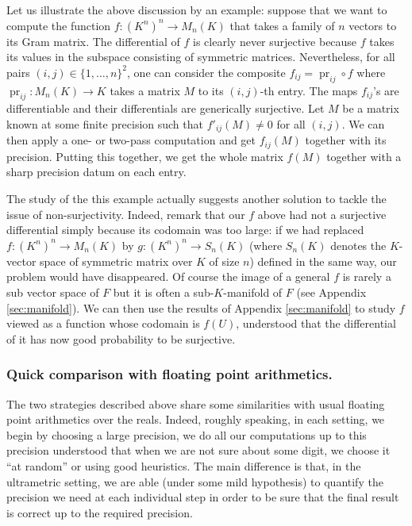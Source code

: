 \documentclass{lms}
\DeclareMathOperator{\pr}{pr}
\begin{document}
Let us illustrate the above discussion by an example: suppose that we 
want to compute the function $f : (K^n)^n \to M_n(K)$ that takes a 
family of $n$ vectors to its Gram matrix. The differential of $f$ is
clearly never surjective because $f$ takes its values in the subspace
consisting of symmetric matrices. Nevertheless, for all pairs $(i,j)
\in \{1, \ldots, n\}^2$, one can consider the composite $f_{ij} = 
\pr_{ij} \circ f$ where $\pr_{ij} : M_n(K) \to K$ takes a matrix 
$M$ to its $(i,j)$-th entry. The maps $f_{ij}$'s are differentiable and 
their differentials are generically surjective. Let $M$ be a matrix known
at some finite precision such that 
$f'_{ij} (M) \neq 0$ for all $(i,j)$. We can then apply a one- or two-pass 
computation and get $f_{ij}(M)$ together with its 
precision. Putting this together, we get the whole matrix $f(M)$ 
together with a sharp precision datum on each entry.

The study of the this example actually suggests another solution to 
tackle the issue of non-surjectivity. Indeed, remark that our $f$ above 
had not a surjective differential simply because its codomain was too 
large: if we had replaced $f : (K^n)^n \to M_n(K)$ by $g : (K^n)^n \to 
S_n(K)$ (where $S_n(K)$ denotes the $K$-vector space of symmetric matrix 
over $K$ of size $n$) defined in the same way, our problem would have 
disappeared. Of course the image of a general $f$ is rarely a sub vector 
space of $F$ but it is often a sub-$K$-manifold of $F$ (see Appendix
\ref{sec:manifold}). We can then use 
the results of Appendix \ref{sec:manifold} to study $f$ viewed as a 
function whose codomain is $f(U)$, understood that the differential of 
it has now good probability to be surjective.

\medskip

\subsubsection*{Quick comparison with floating point arithmetics.}

The two strategies described above share some similarities with usual 
floating point arithmetics over the reals. Indeed, roughly speaking, in 
each setting, we begin by choosing a large precision, we do all our 
computations up to this precision understood that when we are not sure 
about some digit, we choose it ``at random'' or using good heuristics. 
The main difference is that, in the ultrametric setting, we are able 
(under some mild hypothesis) to quantify the precision we need at each 
individual step in order to be sure that the final result is correct up 
to the required precision.
\end{document}

